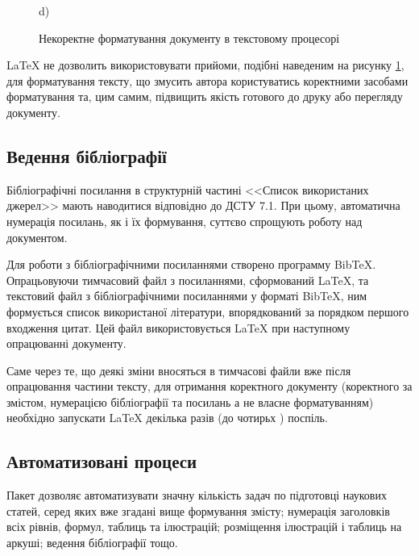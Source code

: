 \begin{figure}[h]
\begin{minipage}[h]{0.47\linewidth}
	\end{minipage}
	\hfill
	\begin{minipage}[h]{0.47\linewidth}
		 d) \\
	\end{minipage}
	\caption{Некоректне форматування документу в текстовому процесорі}
	\label{ris:wrongFormat}
\end{figure}

\LaTeX{} не дозволить використовувати прийоми, подібні наведеним на рисунку \ref{ris:wrongFormat}, для форматування тексту, що змусить автора користуватись коректними засобами форматування та, цим самим, підвищить якість готового до друку або перегляду документу.

\subsection{Ведення бібліографії}

Бібліографічні посилання в структурній частині <<Список використаних джерел>> мають наводитися відповідно до ДСТУ 7.1. При цьому, автоматична нумерація посилань, як і їх формування, суттєво спрощують роботу над документом. 

Для роботи з бібліографічними посиланнями створено программу BibTeX. Опрацьовуючи тимчасовий файл з посиланнями, сформований \LaTeX{}, та текстовий файл з бібліографічними посиланнями у форматі BibTeX, ним формується список використаної літератури, впорядкований за порядком першого входження цитат. Цей файл використовується \LaTeX{} при наступному опрацюванні документу.

Саме через те, що деякі зміни вносяться в тимчасові файли вже після опрацювання частини тексту, для отримання коректного документу (коректного за змістом, нумерацією бібліографії та посилань а не власне форматуванням) необхідно запускати \LaTeX{} декілька разів  (до чотирьх \cite{Stolyarov2010SverstaiDiplom}) поспіль.

\subsection{Автоматизовані процеси}

Пакет дозволяє автоматизувати значну кількість задач по підготовці наукових статей, серед яких вже згадані вище формування змісту; нумерація заголовків всіх рівнів, формул, таблиць та ілюстрацій; розміщення ілюстрацій і таблиць на аркуші; ведення бібліографії тощо.
